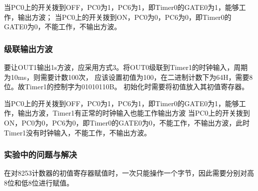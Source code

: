 \documentclass[12pt, a4paper, oneside]{ctexart}
\begin{document}
    当PC0上的开关拨到OFF，PC0为1，PC6为1，即Timer0的GATE0为1，能够工作，输出方波；
    当PC0上的开关拨到ON，PC0为0，PC6为0，即Timer0的GATE0为0，不能工作，不输出方波。


    \subsubsection{级联输出方波}
    要让OUT1输出1s方波，应采用方式3。将OUT0级联到Timer1的时钟输入，周期为10ms，则需要计数100次，
    应该设置初值为100，在二进制计数下为64H，需要8位。故Timer1的控制字为01010110B。
    初始化时需要将初值放入其初值寄存器。

    当PC0上的开关拨到OFF，PC0为1，PC6为1，即Timer0的GATE0为1，能够工作，输出方波，Timer1有正常的时钟输入也能工作输出方波
    当PC0上的开关拨到ON，PC0为0，PC6为0，即Timer0的GATE0为0，不能工作，不输出方波，此时Timer1没有时钟输入，不能工作，不输出方波。
    \subsubsection{实验中的问题与解决}
    在对8253计数器的初值寄存器赋值时，一次只能操作一个字节，因此需要分别对高8位和低8位进行赋值。

    
\end{document}
